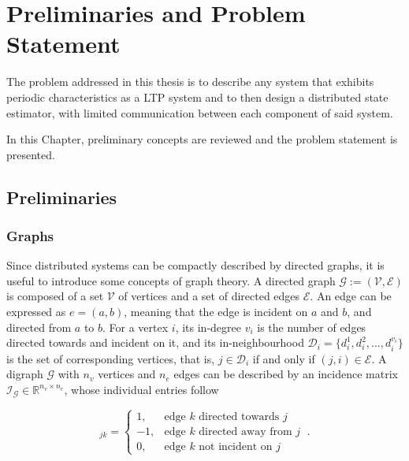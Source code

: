 \chapter{Preliminaries and Problem Statement}

The problem addressed in this thesis is to describe any system that exhibits periodic characteristics as a LTP system and to then design a distributed state estimator, with limited communication between each component of said system.
\par
In this Chapter, preliminary concepts are reviewed and the problem statement is presented.

\section{Preliminaries}

\subsection{Graphs}
Since distributed systems can be compactly described by directed graphs, it is useful to introduce some concepts of graph theory. A directed graph $\mathcal{G}:=(\mathcal{V}, \mathcal{E})$ is composed of a set $\mathcal{V}$ of vertices and a set of directed edges $\mathcal{E}$. An edge can be expressed as $e=(a,b)$, meaning that the edge is incident on $a$ and $b$, and directed from $a$ to $b$. For a vertex $i$, its in-degree $v_i$ is the number of edges directed towards and incident on it, and its in-neighbourhood $\mathcal{D}_i=\{d^1_i, d^2_i,...,d^{v_i}_i\}$ is the set of corresponding vertices, that is, $j \in \mathcal{D}_i$ if and only if $(j,i) \in \mathcal{E}$. A digraph $\mathcal{G}$ with $n_v$ vertices and $n_e$ edges can be described by an incidence matrix $\mathcal{I_\mathcal{G}} \in \mathbb{R}^{{n_v}\times{n_e}}$, whose individual entries follow

\begin{equation*}
  [\mathcal{I_\mathcal{G}}]_{jk} =
    \begin{cases}
      1, & \text{edge $k$ directed towards $j$}\\
     -1, & \text{edge $k$ directed away from $j$}\\
      0, & \text{edge $k$ not incident on $j$}
    \end{cases} \ .       
\end{equation*}

